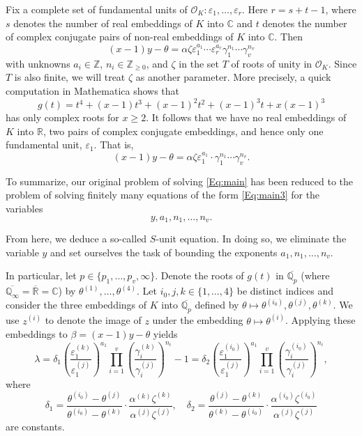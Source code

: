 {Fix a complete set of fundamental units of $\mathcal{O}_K: \varepsilon_1, \dots, \varepsilon_r$. Here $r = s + t -1$, where $s$ denotes the number of real embeddings of $K$ into $\mathbb{C}$ and $t$ denotes the number of complex conjugate pairs of non-real embeddings of $K$ into $\mathbb{C}$. Then
\begin{equation} \label{Eq:main2}
(x-1)y - \theta = \alpha \zeta \varepsilon_1^{a_1} \cdots \varepsilon_r^{a_r}\gamma_1^{n_1}\cdots \gamma_v^{n_v}
\end{equation}
with unknowns $a_i \in \mathbb{Z}$, $n_i \in \mathbb{Z}_{\geq 0}$, and $\zeta$ in the set $T$ of roots of unity in $\mathcal{O}_K$. Since $T$ is also finite, we will treat $\zeta$ as another parameter. More precisely, a quick computation in Mathematica shows that  
\[g(t) = t^4 + (x-1)t^3 + (x-1)^2t^2 + (x-1)^3t + x(x-1)^3\]
has only complex roots for $x \geq 2$. It follows that we have no real embeddings of $K$ into $\mathbb{R}$, two pairs of complex conjugate embeddings, and hence only one fundamental unit, $\varepsilon_1$. That is, 
\begin{equation} \label{Eq:main3}
(x-1)y - \theta = \alpha \zeta \varepsilon_1^{a_1} \cdot \gamma_1^{n_1}\cdots \gamma_v^{n_v}.
\end{equation}

To summarize, our original problem of solving \eqref{Eq:main} has been reduced to the problem of solving finitely many equations of the form \eqref{Eq:main3} for the variables 
\[y, a_1, n_1, \dots, n_v.\] 

From here, we deduce a so-called $S$-unit equation. In doing so, we eliminate the variable $y$ and set ourselves the task of bounding the exponents $a_1, n_1, \dots, n_v$. 

In particular, let $p \in \{p_1, \dots, p_v, \infty\}$. Denote the roots of $g(t)$ in $\overline{\mathbb{Q}_p}$ (where $\overline{\mathbb{Q}_{\infty}} = \overline{\mathbb{R}} = \mathbb{C}$) by $\theta^{(1)}, \dots, \theta^{(4)}$. Let $i_0, j, k \in \{1, \dots, 4\}$ be distinct indices and consider the three embeddings of $K$ into $\overline{\mathbb{Q}_p}$ defined by $\theta \mapsto \theta^{(i_0)}, \theta^{(j)}, \theta^{(k)}$. We use $z^{(i)}$ to denote the image of $z$ under the embedding $\theta \mapsto \theta^{(i)}$. Applying these embeddings to $\beta = (x-1)y - \theta$ yields
\begin{equation}\label{Eq:Sunit}
\lambda = \delta_1 \left( \frac{\varepsilon_1^{(k)}}{\varepsilon_1^{(j)}}\right)^{a_1}\prod_{i = 1}^v \left( \frac{\gamma_i^{(k)}}{\gamma_i^{(j)}}\right)^{n_i} - 1 = \delta_2 \left( \frac{\varepsilon_1^{(i_0)}}{\varepsilon_1^{(j)}}\right)^{a_1} \prod_{i = 1}^v \left( \frac{\gamma_i^{(i_0)}}{\gamma_i^{(j)}}\right)^{n_i},
\end{equation}
where
\[\delta_1 = \frac{\theta^{(i_0)} - \theta^{(j)}}{\theta^{(i_0)} - \theta^{(k)}}\cdot\frac{\alpha^{(k)}\zeta^{(k)}}{\alpha^{(j)}\zeta^{(j)}}, \quad \delta_2 = \frac{\theta^{(j)} - \theta^{(k)}}{\theta^{(k)} - \theta^{(i_0)}}\cdot \frac{\alpha^{(i_0)}\zeta^{(i_0)}}{\alpha^{(j)}\zeta^{(j)}}\]
are constants. 

}
